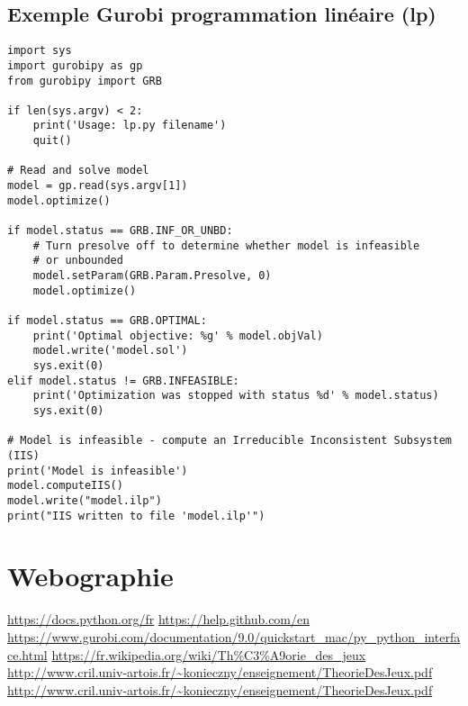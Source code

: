 \documentclass[a4paper, 12pt, twoside]{article}
\begin{document}
\subsection{Exemple Gurobi programmation linéaire (lp)}
\begin{verbatim}
import sys
import gurobipy as gp
from gurobipy import GRB

if len(sys.argv) < 2:
    print('Usage: lp.py filename')
    quit()

# Read and solve model
model = gp.read(sys.argv[1])
model.optimize()

if model.status == GRB.INF_OR_UNBD:
    # Turn presolve off to determine whether model is infeasible
    # or unbounded
    model.setParam(GRB.Param.Presolve, 0)
    model.optimize()

if model.status == GRB.OPTIMAL:
    print('Optimal objective: %g' % model.objVal)
    model.write('model.sol')
    sys.exit(0)
elif model.status != GRB.INFEASIBLE:
    print('Optimization was stopped with status %d' % model.status)
    sys.exit(0)

# Model is infeasible - compute an Irreducible Inconsistent Subsystem (IIS)
print('Model is infeasible')
model.computeIIS()
model.write("model.ilp")
print("IIS written to file 'model.ilp'")
\end{verbatim}


\newpage	








\section{Webographie}
\begin{thebibliography}{2}
    \url{https://docs.python.org/fr}\newline
      \url{https://help.github.com/en}\newline
         \url{https://www.gurobi.com/documentation/9.0/quickstart_mac/py_python_interface.html}\newline
   \url{https://fr.wikipedia.org/wiki/Th\%C3\%A9orie_des_jeux}\newline
   \url{http://www.cril.univ-artois.fr/~konieczny/enseignement/TheorieDesJeux.pdf}\newline
   \url{http://www.cril.univ-artois.fr/~konieczny/enseignement/TheorieDesJeux.pdf}\newline
\end{thebibliography}
\end{document}
